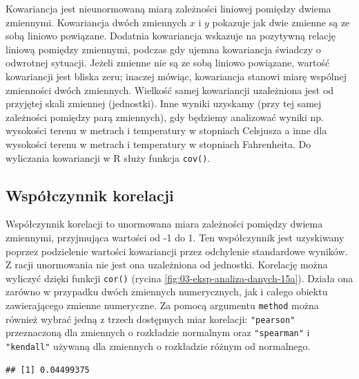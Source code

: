 \documentclass[
  paper=6in:9in,pagesize=pdftex,headinclude=on,footinclude=on,10pt]{scrbook}
\newenvironment{Shaded}{\begin{snugshade}}{\end{snugshade}}
\newcommand{\AttributeTok}[1]{\textcolor[rgb]{0.13,0.29,0.53}{#1}}
\newcommand{\FunctionTok}[1]{\textcolor[rgb]{0.13,0.29,0.53}{\textbf{#1}}}
\newcommand{\NormalTok}[1]{#1}
\newcommand{\SpecialCharTok}[1]{\textcolor[rgb]{0.81,0.36,0.00}{\textbf{#1}}}
\newcommand{\StringTok}[1]{\textcolor[rgb]{0.31,0.60,0.02}{#1}}
\begin{document}
Kowariancja jest nieunormowaną miarą zależności liniowej pomiędzy dwiema zmiennymi.
Kowariancja dwóch zmiennych \(x\) i \(y\) pokazuje jak dwie zmienne są ze sobą liniowo powiązane.
Dodatnia kowariancja wskazuje na pozytywną relację liniową pomiędzy zmiennymi, podczas gdy ujemna kowariancja świadczy o odwrotnej sytuacji.
Jeżeli zmienne nie są ze sobą liniowo powiązane, wartość kowariancji jest bliska zeru; inaczej mówiąc, kowariancja stanowi miarę wspólnej zmienności dwóch zmiennych.
Wielkość samej kowariancji uzależniona jest od przyjętej skali zmiennej (jednostki).
Inne wyniki uzyskamy (przy tej samej zależności pomiędzy parą zmiennych), gdy będziemy analizować wyniki np. wysokości terenu w metrach i temperatury w stopniach Celsjusza a inne dla wysokości terenu w metrach i temperatury w stopniach Fahrenheita.
Do wyliczania kowariancji w R służy funkcja \texttt{cov()}.

\subsection{Współczynnik korelacji}\label{wspuxf3ux142czynnik-korelacji}

Współczynnik korelacji to unormowana miara zależności pomiędzy dwiema zmiennymi, przyjmująca wartości od -1 do 1.
Ten współczynnik jest uzyskiwany poprzez podzielenie wartości kowariancji przez odchylenie standardowe wyników.
Z racji unormowania nie jest ona uzależniona od jednostki.
Korelację można wyliczyć dzięki funkcji \texttt{cor()} (rycina \ref{fig:03-eksp-analiza-danych-15a}).
Działa ona zarówno w przypadku dwóch zmiennych numerycznych, jak i całego obiektu zawierającego zmienne numeryczne.
Za pomocą argumentu \texttt{method} można również wybrać jedną z trzech dostępnych miar korelacji: \texttt{"pearson"} przeznaczoną dla zmiennych o rozkładzie normalnym oraz \texttt{"spearman"} i \texttt{"kendall"} używaną dla zmiennych o rozkładzie różnym od normalnego.

\begin{Shaded}
\end{Shaded}

\begin{verbatim}
## [1] 0.04499375
\end{verbatim}
\end{document}
